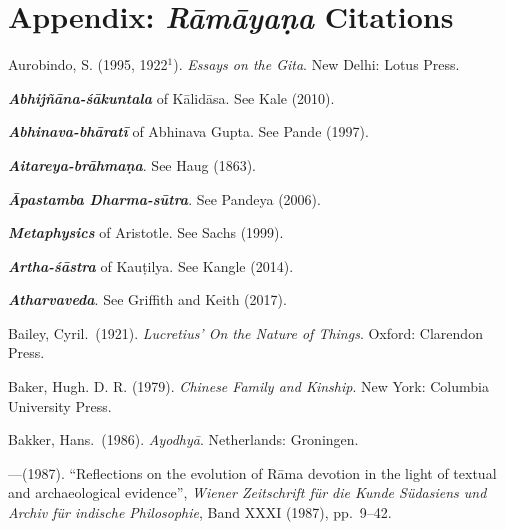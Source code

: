 \newpage
\label{notes}
\theendnotes

\newpage

\chapter*{Appendix: {\sl\bfseries Rāmāyaṇa} Citations}


\newpage
\thispagestyle{plain}


\begin{thebibliography}{99}
\label{bibliography}
\itemsep=2pt
{Aurobindo, S.} (1995, 1922$^{1}$). {\sl Essays on the Gita}. New Delhi: Lotus Press. 

{\sl\bfseries Abhijñāna-śākuntala} of Kālidāsa. See Kale (2010). 

{\sl\bfseries Abhinava-bhāratī} of Abhinava Gupta. See Pande (1997).

{\sl\bfseries Aitareya-brāhmaṇa}. See Haug (1863).

{\sl\bfseries Āpastamba Dharma-sūtra}. See Pandeya (2006).

{\sl\bfseries Metaphysics} of Aristotle. See Sachs (1999).

{\sl\bfseries Artha-śāstra} of Kauṭilya. See Kangle (2014).  

{\sl\bfseries Atharvaveda}. See Griffith and Keith (2017).

Bailey, Cyril.\ (1921). {\sl Lucretius’ On the Nature of Things}. Oxford: Clarendon Press. 

Baker, Hugh. D. R. (1979). {\sl Chinese Family and Kinship}. New York: Columbia University Press. 

Bakker, Hans.\ (1986). {\sl Ayodhyā}. Netherlands: Groningen. 

---\kern3pt(1987). “Reflections on the evolution of Rāma devotion in the light of textual and archaeological evidence”, {\sl Wiener Zeitschrift für die Kunde Südasiens und Archiv für indische Philosophie}, Band XXXI (1987), pp.~9--42. 


\end{thebibliography}
